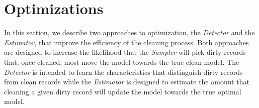 \section{Optimizations}\label{opti}


In this section, we describe two approaches to optimization, the {\it Detector} and the {\it Estimator}, that
improve the efficiency of the cleaning process.  
Both approaches are designed to increase the likelihood that the 
{\it Sampler} will pick dirty records that, once cleaned,
most move the model towards the true clean model.
The {\it Detector} is intended to learn the characteristics that distinguish dirty records from clean records
while the {\it Estimator} is designed to estimate the amount that cleaning a given dirty record will update the 
model towards the true optimal model.




